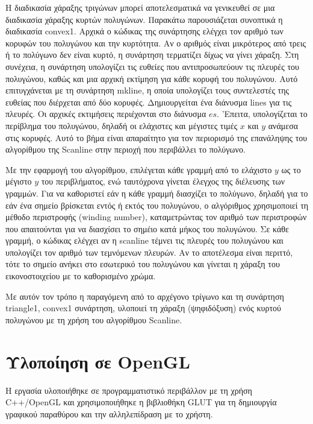 Η διαδικασία χάραξης τριγώνων μπορεί αποτελεσματικά να γενικευθεί σε μια διαδικασία χάραξης κυρτών πολυγώνων. Παρακάτω παρουσιάζεται συνοπτικά η διαδικασία \textlatin{convex1}. Αρχικά ο κώδικας της συνάρτησης ελέγχει τον αριθμό των κορυφών του πολυγώνου και την κυρτότητα. Αν ο αριθμός είναι μικρότερος από τρεις ή το πολύγωνο δεν είναι κυρτό, η συνάρτηση τερματίζει δίχως να γίνει χάραξη. Στη συνέχεια, η συνάρτηση υπολογίζει τις ευθείες που αντιπροσωπεύουν τις πλευρές του πολυγώνου, καθώς και μια αρχική εκτίμηση για κάθε κορυφή του πολυγώνου. Αυτό επιτυγχάνεται με τη συνάρτηση \textlatin{mkline}, η οποία υπολογίζει τους συντελεστές της ευθείας που διέρχεται από δύο κορυφές. Δημιουργείται ένα διάνυσμα \textlatin{lines} για τις πλευρές. Οι αρχικές εκτιμήσεις περιέχονται στο διάνυσμα $es$. 'Επειτα, υπολογίζεται το περίβλημα του πολυγώνου, δηλαδή οι ελάχιστες και μέγιστες τιμές $x$ και $y$ ανάμεσα στις κορυφές. Αυτό το βήμα είναι απαραίτητο για τον περιορισμό της επανάληψης του αλγορίθμου της \textlatin{Scanline} στην περιοχή που περιβάλλει το πολύγωνο. 
\par
Με την εφαρμογή του αλγορίθμου, επιλέγεται κάθε γραμμή από το ελάχιστο $y$ ως το μέγιστο $y$ του περιβλήματος, ενώ ταυτόχρονα γίνεται έλεγχος της διέλευσης των γραμμών. Για να καθοριστεί εάν η κάθε γραμμή διασχίζει το πολύγωνο, δηλαδή για το εάν ένα σημείο βρίσκεται εντός ή εκτός του πολυγώνου, ο αλγόριθμος χρησιμοποιεί τη μέθοδο περιστροφής \textlatin{(winding number)}, καταμετρώντας τον αριθμό των περιστροφών που απαιτούνται για να διασχίσει το σημέιο κατά μήκος του πολυγώνου. Σε κάθε γραμμή, ο κώδικας ελέγχει αν η \textlatin{scanline} τέμνει τις πλευρές του πολυγώνου και υπολογίζει τον αριθμό των τεμνόμενων πλευρών. Αν το αποτέλεσμα είναι περιττό, τότε το σημείο ανήκει στο εσωτερικό του πολυγώνου και γίνεται η χάραξη του εικονοστοιχείου με το καθορισμένο χρώμα.   
\par
Με αυτόν τον τρόπο η παραγόμενη από το αρχέγονο τρίγωνο και τη συνάρτηση \textlatin{triangle1}, \textlatin{convex1} συνάρτηση, υλοποιεί τη χάραξη (ψηφιδόξυση) ενός κυρτού πολυγώνου με τη χρήση του αλγορίθμου \textlatin{Scanline}.  

\section{Υλοποίηση σε \textlatin{OpenGL}}

Η εργασία υλοποιήθηκε σε προγραμματιστικό περιβάλλον με τη χρήση \textlatin{C++/OpenGL} και χρησιμοποιήθηκε η βιβλιοθήκη \textlatin{GLUT} για τη δημιουργία γραφικού παραθύρου και την αλληλεπίδραση με το χρήστη. 

